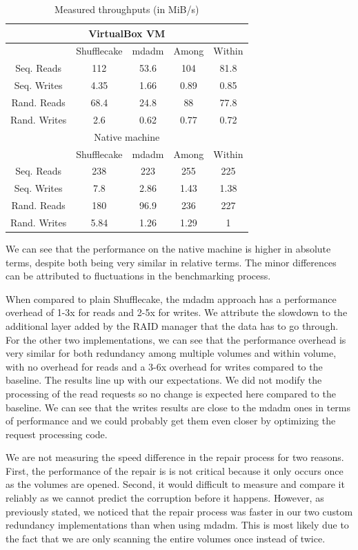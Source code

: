 \documentclass[a4paper,11pt,oneside]{report}
\begin{document}
\begin{table}[ht]
\begin{center}
\begin{tabular}{ |c||c|c|c|c|  }
 \hline
 \multicolumn{5}{|c|}{VirtualBox VM} \\
 \hline
 & Shufflecake & mdadm & Among & Within\\
 \hline
 Seq. Reads & 112 & 53.6 & 104 & 81.8\\
 Seq. Writes & 4.35 & 1.66 & 0.89 & 0.85\\
 Rand. Reads & 68.4 & 24.8 & 88 & 77.8\\
 Rand. Writes & 2.6 & 0.62 & 0.77 & 0.72\\
 \hline
 \multicolumn{5}{|c|}{Native machine} \\
 \hline
 & Shufflecake & mdadm & Among & Within\\
 \hline
 Seq. Reads & 238 & 223 & 255 & 225\\
 Seq. Writes & 7.8 & 2.86 & 1.43 & 1.38\\
 Rand. Reads & 180 & 96.9 & 236 & 227\\
 Rand. Writes & 5.84 & 1.26 & 1.29 & 1\\
 \hline
\end{tabular}
\caption{Measured throughputs (in MiB/s)}
\label{tab:results}
\end{center}
\end{table}

We can see that the performance on the native machine is higher in absolute terms, despite both being very similar in relative terms. The minor differences can be attributed to fluctuations in the benchmarking process.

When compared to plain Shufflecake, the mdadm approach has a performance overhead of 1-3x for reads and 2-5x for writes. We attribute the slowdown to the additional layer added by the RAID manager that the data has to go through. For the other two implementations, we can see that the performance overhead is very similar for both redundancy among multiple volumes and within volume, with no overhead for reads and a 3-6x overhead for writes compared to the baseline. The results line up with our expectations. We did not modify the processing of the read requests so no change is expected here compared to the baseline. We can see that the writes results are close to the mdadm ones in terms of performance and we could probably get them even closer by optimizing the request processing code.

We are not measuring the speed difference in the repair process for two reasons. First, the performance of the repair is is not critical because it only occurs once as the volumes are opened. Second, it would difficult to measure and compare it reliably as we cannot predict the corruption before it happens. However, as previously stated, we noticed that the repair process was faster in our two custom redundancy implementations than when using mdadm. This is most likely due to the fact that we are only scanning the entire volumes once instead of twice.
\end{document}
